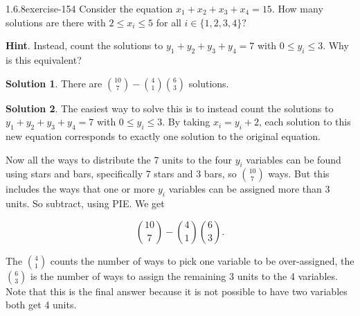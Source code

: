 \documentclass[twoside,11pt,]{book}
\numberwithin{equation}{chapter}
\begin{document}
\begin{divisionsolution}{1.6.8}{}{exercise-154}%
\hypertarget{p-2553}{}%
Consider the equation \(x_1 + x_2 + x_3 + x_4 = 15\text{.}\) How many solutions are there with \(2 \le x_i \le 5\) for all \(i \in \{1,2,3,4\}\text{?}\)%
\par\smallskip%
\noindent\textbf{Hint}.\quad%
\hypertarget{p-2555}{}%
Instead, count the solutions to \(y_1 + y_2 + y_3 + y_4 = 7\) with \(0 \le y_i \le 3\text{.}\)  Why is this equivalent?%
\par\smallskip%
\noindent\textbf{Solution 1}.\quad%
\hypertarget{p-2556}{}%
There are \({10 \choose 7} - {4\choose 1} {6 \choose 3}\) solutions.%
\par\smallskip%
\noindent\textbf{Solution 2}.\quad%
\hypertarget{p-2557}{}%
The easiest way to solve this is to instead count the solutions to \(y_1 + y_2 + y_3 + y_4 = 7\) with \(0 \le y_i \le 3\text{.}\) By taking \(x_i = y_i+2\text{,}\) each solution to this new equation corresponds to exactly one solution to the original equation.%
\par
\hypertarget{p-2558}{}%
Now all the ways to distribute the 7 units to the four \(y_i\) variables can be found using stars and bars, specifically 7 stars and 3 bars, so \({10 \choose 7}\) ways. But this includes the ways that one or more \(y_i\) variables can be assigned more than 3 units. So subtract, using PIE. We get%
\par
\hypertarget{p-2559}{}%
%
\begin{equation*}
{10 \choose 7} - {4\choose 1} {6 \choose 3}
\text{.}
\end{equation*}
%
\par
\hypertarget{p-2560}{}%
The \({4 \choose 1}\) counts the number of ways to pick one variable to be over-assigned, the \({6 \choose 3}\) is the number of ways to assign the remaining 3 units to the 4 variables. Note that this is the final answer because it is not possible to have two variables both get 4 units.%
\end{divisionsolution}%
\end{document}
